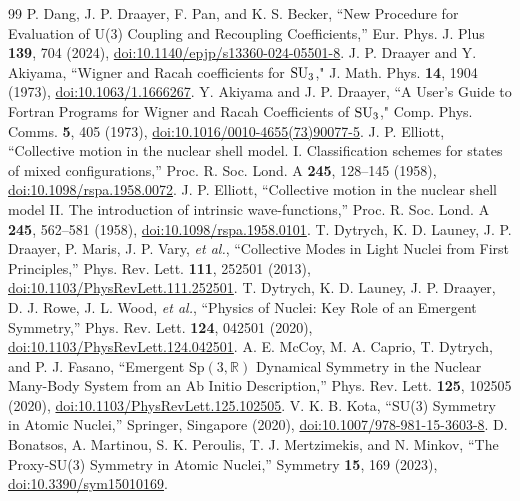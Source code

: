 \documentclass[aps,onecolumn,10pt,superscriptaddress,floatfix,nofootinbib]{revtex4}
\begin{document}
\begin{thebibliography}{99}
 P. Dang, J. P. Draayer, F. Pan, and K. S. Becker, ``New Procedure for Evaluation of U(3) Coupling and Recoupling Coefficients,'' Eur. Phys. J. Plus \textbf{139}, 704 (2024), \href{https://doi.org/10.1140/epjp/s13360-024-05501-8}{doi:10.1140/epjp/s13360-024-05501-8}.
 J. P. Draayer and Y. Akiyama, ``Wigner and Racah coefficients for $\rm SU_3$," J. Math. Phys. \textbf{14}, 1904 (1973), \href{https://doi.org/10.1063/1.1666267}{doi:10.1063/1.1666267}.
 Y. Akiyama and J. P. Draayer, ``A User's Guide to Fortran Programs for Wigner and Racah Coefficients of $\rm SU_3$," Comp. Phys. Comms. \textbf{5}, 405 (1973), \href{https://doi.org/10.1016/0010-4655(73)90077-5}{doi:10.1016/0010-4655(73)90077-5}.
 J. P. Elliott, ``Collective motion in the nuclear shell model. I. Classification schemes for states of mixed configurations,'' Proc. R. Soc. Lond. A \textbf{245}, 128--145 (1958), \href{https://doi.org/10.1098/rspa.1958.0072}{doi:10.1098/rspa.1958.0072}.
 J. P. Elliott, ``Collective motion in the nuclear shell model II. The introduction of intrinsic wave-functions,'' Proc. R. Soc. Lond. A \textbf{245}, 562--581 (1958), \href{https://doi.org/10.1098/rspa.1958.0101}{doi:10.1098/rspa.1958.0101}.
 T. Dytrych, K. D. Launey, J. P. Draayer, P. Maris, J. P. Vary, \textit{et al.}, ``Collective Modes in Light Nuclei from First Principles,'' Phys. Rev. Lett. \textbf{111}, 252501 (2013), \href{https://doi.org/10.1103/PhysRevLett.111.252501}{doi:10.1103/PhysRevLett.111.252501}.
 T. Dytrych, K. D. Launey, J. P. Draayer, D. J. Rowe, J. L. Wood, \textit{et al.}, ``Physics of Nuclei: Key Role of an Emergent Symmetry,'' Phys. Rev. Lett. \textbf{124}, 042501 (2020), \href{https://doi.org/10.1103/PhysRevLett.124.042501}{doi:10.1103/PhysRevLett.124.042501}.
 A. E. McCoy, M. A. Caprio, T. Dytrych, and P. J. Fasano, ``Emergent $\mathrm{Sp}(3,\mathbb{R})$ Dynamical Symmetry in the Nuclear Many-Body System from an Ab Initio Description,'' Phys. Rev. Lett. \textbf{125}, 102505 (2020), \href{https://doi.org/10.1103/PhysRevLett.125.102505}{doi:10.1103/PhysRevLett.125.102505}.
 V. K. B. Kota, ``SU(3) Symmetry in Atomic Nuclei,'' Springer, Singapore (2020), \href{https://doi.org/10.1007/978-981-15-3603-8}{doi:10.1007/978-981-15-3603-8}.
 D. Bonatsos, A. Martinou, S. K. Peroulis, T. J. Mertzimekis, and N. Minkov, ``The Proxy-SU(3) Symmetry in Atomic Nuclei,'' Symmetry \textbf{15}, 169 (2023), \href{https://doi.org/10.3390/sym15010169}{doi:10.3390/sym15010169}.

\end{thebibliography}
\end{document}
